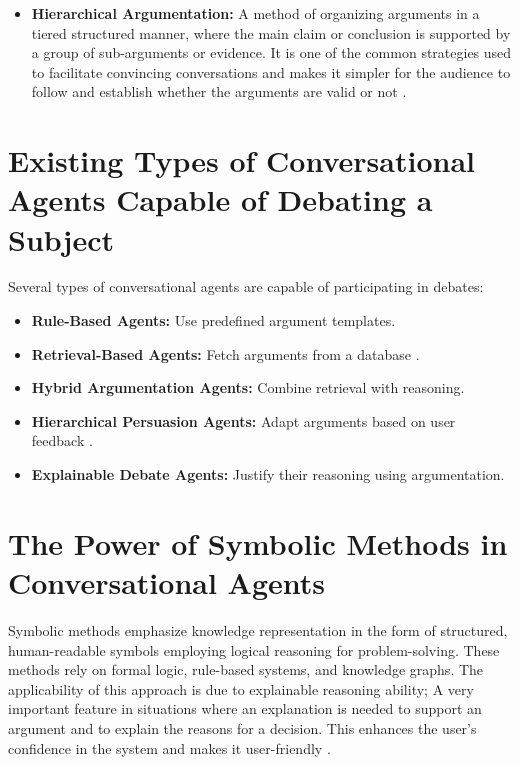 \documentclass[conference]{IEEEtran}
\begin{document}
\begin{itemize}
    \item \textbf{Hierarchical Argumentation:} A method of organizing arguments in a tiered structured manner, where the main claim or conclusion is supported by a group of sub-arguments or evidence. It is one of the common strategies used to facilitate convincing conversations and makes it simpler for the audience to follow and establish whether the arguments are valid or not  \cite{b5}.
\end{itemize}

\section{Existing Types of Conversational Agents Capable of Debating a Subject}
Several types of conversational agents are capable of participating in debates:

\begin{itemize}
    \item \textbf{Rule-Based Agents:} Use predefined argument templates.
    \item \textbf{Retrieval-Based Agents:} Fetch arguments from a database \cite{b3}.
    \item \textbf{Hybrid Argumentation Agents:} Combine retrieval with reasoning.
    \item \textbf{Hierarchical Persuasion Agents:} Adapt arguments based on user feedback \cite{b5}.
    \item \textbf{Explainable Debate Agents:} Justify their reasoning using argumentation.
\end{itemize}


\section{The Power of Symbolic Methods in Conversational Agents}
Symbolic methods emphasize knowledge representation in the form of structured, human-readable symbols employing logical reasoning for problem-solving. These methods rely on formal logic, rule-based systems, and knowledge graphs. The applicability of this approach is due to explainable reasoning ability; A very important feature in situations where an explanation is needed to support an argument and to explain the reasons for a decision. This enhances the user's confidence in the system and makes it user-friendly \cite{b8}.
\end{document}

